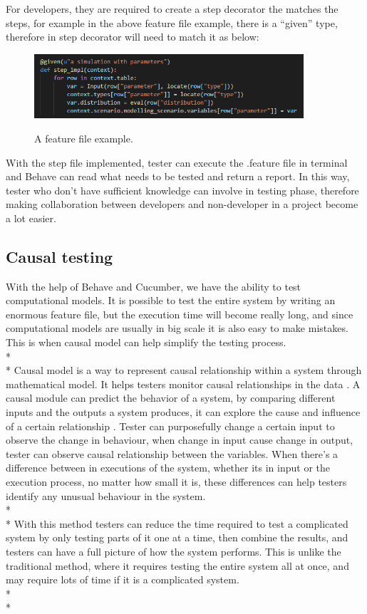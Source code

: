 For developers, they are required to create a step decorator the matches the steps, for example in the above feature file example, there is a “given” type, therefore in step decorator will need to match it as below:
\begin{figure}[h]
	\centering
	\includegraphics[width=10cm]{figures/stepFile.png}\\
	\caption{A feature file example.}
	\label{fig:figure2}
\end{figure}

With the step file implemented, tester can execute the .feature file in terminal and Behave can read what needs to be tested and return a report. In this way, tester who don’t have sufficient knowledge can involve in testing phase, therefore making collaboration between developers and non-developer in a project become a lot easier.

\subsection{Causal testing}
With the help of Behave and Cucumber, we have the ability to test computational models. It is possible to test the entire system by writing an enormous feature file, but the execution time will become really long, and since computational models are usually in big scale it is also easy to make mistakes. This is when causal model can help simplify the testing process. \\*\\*
Causal model is a way to represent causal relationship within a system through mathematical model. It helps testers monitor causal relationships in the data \cite{Reference16}. A causal module can predict the behavior of a system, by comparing different inputs and the outputs a system produces, it can explore the cause and influence of a certain relationship \cite{Reference17}. Tester can purposefully change a certain input to observe the change in behaviour, when change in input cause change in output, tester can observe causal relationship between the variables. When there’s a difference between in executions of the system, whether its in input or the execution process, no matter how small it is, these differences can help testers identify any unusual behaviour in the system.\cite{Reference18} \\*\\*
With this method testers can reduce the time required to test a complicated system by only testing parts of it one at a time, then combine the results, and testers can have a full picture of how the system performs. This is unlike the traditional method, where it requires testing the entire system all at once, and may require lots of time if it is a complicated system. \\*\\*

